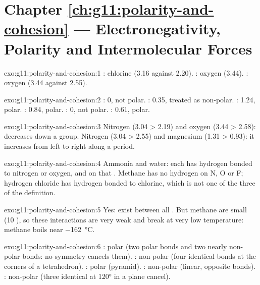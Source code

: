 \section*{Chapter \ref{ch:g11:polarity-and-cohesion} --- Electronegativity, Polarity and Intermolecular Forces}

\begin{solution}{exo:g11:polarity-and-cohesion:1}
: chlorine (3.16 against 2.20). : oxygen (3.44).
: oxygen (3.44 against 2.55).
\end{solution}

\begin{solution}{exo:g11:polarity-and-cohesion:2}
: 0, not polar. : 0.35, treated as non-polar. :
1.24, polar. : 0.84, polar. : 0, not polar. :
0.61, polar.
\end{solution}

\begin{solution}{exo:g11:polarity-and-cohesion:3}
Nitrogen (3.04 > 2.19) and oxygen (3.44 > 2.58): 
decreases down a group. Nitrogen (3.04 > 2.55) and magnesium
(1.31 > 0.93): it increases from left to right along a period.
\end{solution}

\begin{solution}{exo:g11:polarity-and-cohesion:4}
Ammonia and water: each has hydrogen  bonded to nitrogen or oxygen,
and  on that . Methane has no hydrogen on N, O or F;
hydrogen chloride has hydrogen bonded to chlorine, which is not one of
the three  of the definition.
\end{solution}

\begin{solution}{exo:g11:polarity-and-cohesion:5}
Yes:  exist between all . But methane
 are small (10 ), so these interactions are very weak
and break at very low temperature: methane boils near
\qty{-162}{\celsius}.
\end{solution}

\begin{solution}{exo:g11:polarity-and-cohesion:6}
: polar (two polar  bonds and two nearly non-polar
 bonds: no symmetry cancels them). : non-polar (four
identical bonds at the corners of a tetrahedron). : polar
(pyramid). : non-polar (linear, opposite bonds). :
non-polar (three identical  at \ang{120} in a plane cancel).
\end{solution}

